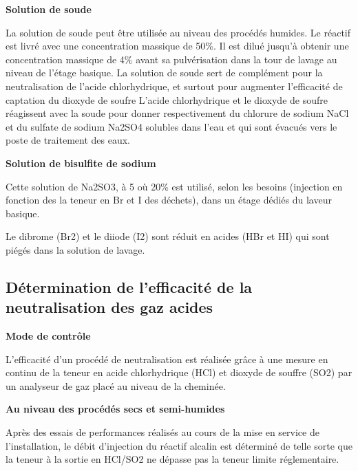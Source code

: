 \vspace{0.3cm}
\textbf{Solution de soude}
\vspace{0.3cm}

La solution de soude peut être utilisée au niveau des procédés humides. 
Le réactif est livré avec une concentration massique de 50\%. Il est dilué jusqu’à obtenir une concentration massique de 4\% avant sa pulvérisation dans la tour de lavage au niveau de l’étage basique. La solution de soude sert de complément pour la neutralisation de l’acide chlorhydrique, et surtout pour augmenter l’efficacité de captation du dioxyde de soufre L’acide chlorhydrique et le dioxyde de soufre réagissent avec la soude pour donner respectivement du chlorure de sodium NaCl et du sulfate de sodium Na2SO4 solubles dans l’eau et qui sont évacués vers le poste de traitement des eaux.


\vspace{0,3cm}
\textbf{Solution de bisulfite de sodium}
\vspace{0,3cm}


Cette solution de Na2SO3, à 5 où 20\% est utilisé, selon les besoins (injection en fonction des la teneur en Br et I des déchets), dans un étage dédiés du laveur basique.
\vspace{0.3cm}

Le dibrome (Br2) et le diiode (I2) sont réduit en acides (HBr et HI) qui sont piégés dans la solution de lavage.



\subsection{Détermination de l'efficacité de la neutralisation des gaz acides}

\vspace{0.3cm}
\textbf{Mode de contrôle}
\vspace{0.3cm}

L’efficacité d’un procédé de neutralisation est réalisée grâce à une mesure en continu de la teneur en acide chlorhydrique (HCl) et dioxyde de souffre (SO2) par un analyseur de gaz placé au niveau de la cheminée.

\vspace{0,3cm}
\textbf{Au niveau des procédés secs et semi-humides}
\vspace{0,3cm}

Après des essais de performances réalisés au cours de la mise en service de l’installation, le débit d’injection du réactif alcalin est déterminé de telle sorte que la teneur à la sortie en HCl/SO2 ne dépasse pas la teneur limite réglementaire.
\vspace{0.3cm}

